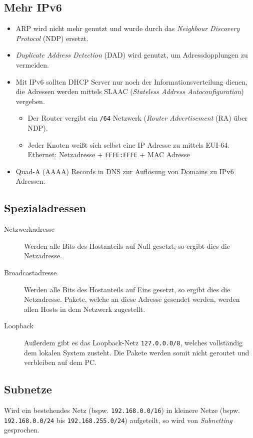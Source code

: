         \subsection{Mehr IPv6} %
            \begin{itemize}
            	\item ARP wird nicht mehr genutzt und wurde durch das \textit{Neighbour Discovery Protocol} (NDP) ersetzt.
            	\item \textit{Duplicate Address Detection} (DAD) wird genutzt, um Adressdopplungen zu vermeiden.
            	\item Mit IPv6 sollten DHCP Server nur noch der Informationsverteilung dienen, die Adressen werden mittels SLAAC (\textit{Stateless Address Autoconfiguration}) vergeben.
	            	\begin{itemize}
	            		\item Der Router vergibt ein \texttt{/64} Netzwerk (\textit{Router Advertisement} (RA) über NDP).
	            		\item Jeder Knoten weißt sich selbst eine IP Adresse zu mittels EUI-64. \\ Ethernet: Netzadresse + \texttt{FFFE:FFFE} + MAC Adresse
	            	\end{itemize}
	            \item Quad-A (AAAA) Records in DNS zur Auflösung von Domains zu IPv6 Adressen.
            \end{itemize}

	\subsection{Spezialadressen}
		\begin{description}
			\item[Netzwerkadresse] Werden alle Bits des Hostanteils auf Null gesetzt, so ergibt dies die Netzadresse.
			\item[Broadcastadresse] Werden alle Bits des Hostanteils auf Eins gesetzt, so ergibt dies die Netzadresse. Pakete, welche an diese Adresse gesendet werden, werden allen Hosts in dem Netzwerk zugestellt.
			\item[Loopback] Außerdem gibt es das Loopback-Netz \texttt{127.0.0.0/8}, welches vollständig dem lokalen System zusteht. Die Pakete werden somit nicht geroutet und verbleiben auf dem PC.
		\end{description}

	\subsection{Subnetze}
		Wird ein bestehendes Netz (bspw. \texttt{192.168.0.0/16}) in kleinere Netze (bspw. \texttt{192.168.0.0/24} bis \texttt{192.168.255.0/24}) aufgeteilt, so wird von \textit{Subnetting} gesprochen.

